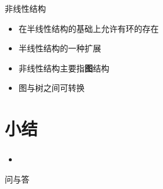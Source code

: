 \begin{frame}
    \begin{block}{非线性结构}
        \begin{itemize}
            \item 在半线性结构的基础上允许有环的存在
            \item 半线性结构的一种扩展
            \item 非线性结构主要指\textbf{图}结构
            \item 图与树之间可转换
        \end{itemize}
    \end{block}
\end{frame}




\section{小结}

\begin{frame}
    \frametitle{\insertsectionhead}
    \begin{itemize}
        \item
    \end{itemize}
\end{frame}

\begin{standout}[]
    问与答
\end{standout}